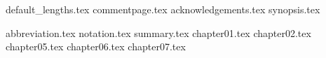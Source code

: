 \documentclass{report}
\begin{document}
	{default_lengths.tex}
	{commentpage.tex}
	{acknowledgements.tex}
	{synopsis.tex}
	\setcounter{tocdepth}{1}
	\hypertarget{tocpage}{}
	\renewcommand{\baselinestretch}{0.5}\normalsize
	\tableofcontents %
	\renewcommand{\baselinestretch}{1.0}\normalsize
	\newpage{}
	\listoffigures %
	\listoftables %
	\newpage
	{abbreviation.tex}
	{notation.tex}
	{summary.tex}
	{chapter01.tex}
	{chapter02.tex}
	{chapter05.tex}
	{chapter06.tex}
	{chapter07.tex}
	\nocite{ben_lynn_phd}
	\nocite{pbc}
	\nocite{sodium}
	\nocite{Washington:2008:ECN:1388394}
	\nocite{Martin:2008:IIE:1370962}
	\printbibliography
	\newpage
\end{document}

